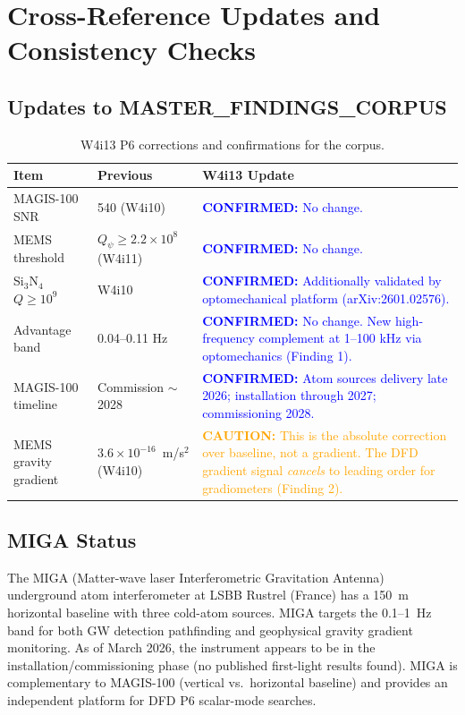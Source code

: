 \documentclass[11pt]{article}
\theoremstyle{definition}
\theoremstyle{remark}
\newcommand{\ee}[1]{\times10^{#1}}
\newcommand{\Qpsi}{Q_\psi}
\newcommand{\confirmed}[1]{\textcolor{blue}{\textbf{CONFIRMED:} #1}}
\newcommand{\caution}[1]{\textcolor{orange}{\textbf{CAUTION:} #1}}
\begin{document}
\section{Cross-Reference Updates and Consistency Checks}
\label{sec:crossref}

\subsection{Updates to MASTER\_FINDINGS\_CORPUS}

\begin{table}[H]
\centering
\small
\caption{W4i13 P6 corrections and confirmations for the corpus.}
\begin{tabular}{@{}p{4cm}p{4cm}p{5cm}@{}}
\toprule
Item & Previous & W4i13 Update \\
\midrule
MAGIS-100 SNR & 540 (W4i10) & \confirmed{No change.} \\
MEMS threshold & $\Qpsi \geq 2.2\ee{8}$ (W4i11) & \confirmed{No change.} \\
Si$_3$N$_4$ $Q \geq 10^9$ & W4i10 & \confirmed{Additionally validated
  by optomechanical platform (arXiv:2601.02576).} \\
Advantage band & 0.04--0.11 Hz & \confirmed{No change. New high-frequency
  complement at 1--100 kHz via optomechanics (Finding 1).} \\
MAGIS-100 timeline & Commission $\sim$2028 & \confirmed{Atom sources
  delivery late 2026; installation through 2027; commissioning 2028.} \\
MEMS gravity gradient & $3.6\ee{-16}$~m/s$^2$ (W4i10) &
  \caution{This is the absolute correction over baseline, not a
  gradient. The DFD gradient signal \emph{cancels} to leading order
  for gradiometers (Finding 2).} \\
\bottomrule
\end{tabular}
\end{table}

\subsection{MIGA Status}

The MIGA (Matter-wave laser Interferometric Gravitation Antenna)
underground atom interferometer at LSBB Rustrel (France) has a
150~m horizontal baseline with three cold-atom sources. MIGA
targets the 0.1--1~Hz band for both GW detection pathfinding and
geophysical gravity gradient monitoring. As of March 2026, the
instrument appears to be in the installation/commissioning phase
(no published first-light results found). MIGA is complementary
to MAGIS-100 (vertical vs.\ horizontal baseline) and provides
an independent platform for DFD P6 scalar-mode searches.
\end{document}
